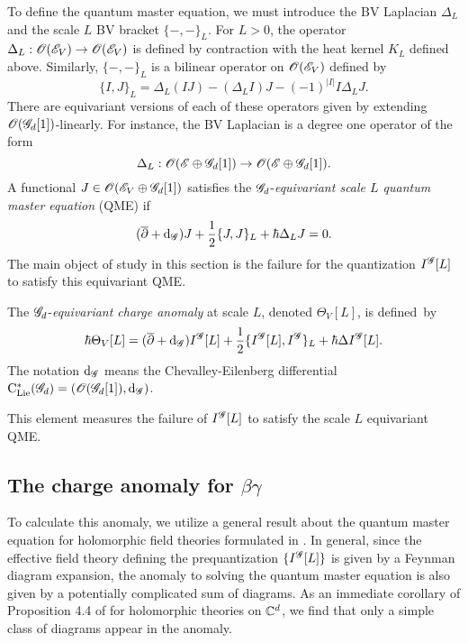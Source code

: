 To define the quantum master equation, we must introduce the BV Laplacian $\Delta_L$ and the scale $L$ BV bracket $\{-,-\}_L$. 
For $L > 0$, the operator $\Delta_L : \mathscr O(\mathscr E_V) \to \mathscr O(\mathscr E_V)$ is defined by contraction with the heat kernel $K_L$ defined above. 
Similarly, $\{-,-\}_L$ is a bilinear operator on $\mathscr O(\mathscr E_V)$ defined by
\[
\{I,J\}_L = \Delta_L(IJ) - (\Delta_L I)J - (-1)^{|I|} I \Delta_L J .
\] 
There are equivariant versions of each of these operators given by extending $\mathscr O(\mathscr G_d[1])$-linearly.
For instance, the BV Laplacian is a degree one operator of the form
\[
\Delta_L : \mathscr O(\mathscr E \oplus \mathscr G_d[1]) \to \mathscr O(\mathscr E \oplus \mathscr G_d[1]) .
\]
A functional $J \in \mathscr O(\mathscr E_V \oplus \mathscr G_d[1])$ satisfies the $\mathscr G_d$-{\em equivariant scale $L$ quantum master equation} (QME) if
\[
(\overline{\partial} + {\rm d}_{\mathscr G}) J+ \frac{1}{2} \{J, J\}_L + \hbar \Delta_L J = 0 .
\]
The main object of study in this section is the failure for the quantization $I^{\mathscr G}[L]$ to satisfy this equivariant QME. 

\begin{dfn}
The $\mathscr G_d$-{\em equivariant charge anomaly} at scale $L$, denoted $ \Theta_V [L]$, is defined~by
\[
\hbar \Theta_V [L] = (\overline{\partial} + {\rm d}_{\mathscr G}) I^{\mathscr G} [L] + \frac{1}{2} \{I^{\mathscr G}[L], I^{\mathscr G}\}_L + \hbar \Delta I^{\mathscr G}[L] .
\]
The notation ${\rm d}_{\mathscr G}$ means the Chevalley-Eilenberg differential ${\rm C}_{{\rm Lie}}^*(\mathscr G_d) = \left(\mathscr O(\mathscr G_d[1]), {\rm d}_{\mathscr G}\right)$. 
\end{dfn}

This element measures the failure of $I^{\mathscr G}[L]$ to satisfy the scale $L$ equivariant QME.

\subsection{The charge anomaly for $\beta\gamma$}

To calculate this anomaly, we utilize a general result about the quantum master equation for holomorphic field theories formulated in \cite{BWhol}. 
In general, since the effective field theory defining the prequantization $\{I^{\mathscr G}[L]\}$ is given by a Feynman diagram expansion, the anomaly to solving the quantum master equation is also given by a potentially complicated sum of diagrams. 
As an immediate corollary of Proposition 4.4 of \cite{BWhol} for holomorphic theories on $\mathbb C^d$, we find that only a simple class of diagrams appear in the anomaly. 

